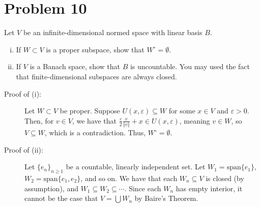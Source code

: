 \documentclass[10pt]{extarticle}
\newcommand{\norm}[1]{\left\Vert #1\right\Vert}
\begin{document}
  \section{Problem 10}%
  Let $V$ be an infinite-dimensional normed space with linear basis $B$.
  \begin{enumerate}[(i)]
    \item If $W\subset V$ is a proper subspace, show that $W^{\circ} = \emptyset$.
    \item If $V$ is a Banach space, show that $B$ is uncountable. You may used the fact that finite-dimensional subspaces are always closed.
  \end{enumerate}
  \begin{description}
    \item[Proof of (i):] Let $W\subset V$ be proper. Suppose $U(x,\varepsilon) \subseteq W$ for some $x\in V$ and $\varepsilon > 0$. Then, for $v\in V$, we have that $\frac{\varepsilon}{2}\frac{v}{\norm{v}} + x \in U(x,\varepsilon)$, meaning $v \in W$, so $V\subseteq W$, which is a contradiction. Thus, $W^{\circ} = \emptyset$.
    \item[Proof of (ii):] Let $\{e_n\}_{n\geq 1}$ be a countable, linearly independent set. Let $W_1 = \text{span}\{e_1\}$, $W_2 = \text{span}\{e_1,e_2\}$, and so on. We have that each $W_n\subseteq V$ is closed (by assumption), and $W_1\subseteq W_2\subseteq \cdots $. Since each $W_n$ has empty interior, it cannot be the case that $V = \bigcup W_n$ by Baire's Theorem.
  \end{description}
\end{document}
